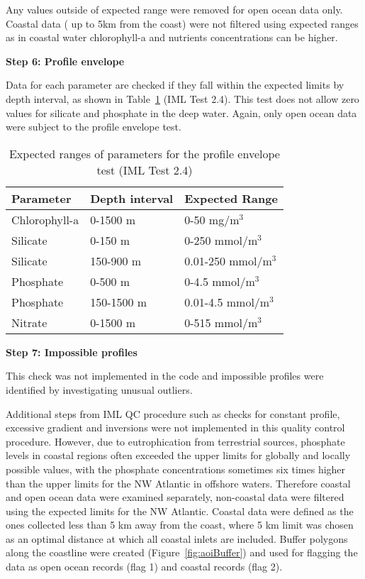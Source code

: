 \documentclass[letterpaper,portrait,11pt]{scrartcl}
\numberwithin{equation}{section}		%
\numberwithin{figure}{section}		%
\numberwithin{table}{section}				%
\begin{document}
\begin{appendices}
Any values outside of expected range were removed for open ocean data only. Coastal data ( up to 5km from the coast) were not filtered using expected ranges as in coastal water chlorophyll-a and nutrients concentrations can be higher. 

\textbf{Step 6: Profile envelope}

Data  for each parameter are checked if they fall within the expected limits by depth interval, as shown in Table~\ref{table:BioChemQC} (IML Test 2.4). This test does not allow zero values for silicate and phosphate in the deep water. Again, only open ocean data were subject to the profile envelope test.

\begin{table}[h]
\label{table:BioChemQC}
\caption{Expected ranges of parameters for the profile envelope test (IML Test 2.4)}
\begin{tabular}{lll}
Parameter & Depth interval & Expected Range \\
\hline
Chlorophyll-a & 0-1500 m & 0-50 mg/m$^{3}$ \\
Silicate & 0-150 m & 0-250 mmol/m$^{3}$ \\
Silicate & 150-900 m & 0.01-250 mmol/m$^{3}$ \\
Phosphate & 0-500 m & 0-4.5 mmol/m$^{3}$ \\
Phosphate & 150-1500 m & 0.01-4.5 mmol/m$^{3}$ \\
Nitrate & 0-1500 m & 0-515 mmol/m$^{3}$ \\
\end{tabular}
\end{table}


\textbf{Step 7: Impossible profiles}

This check was not implemented in the code and impossible profiles were identified by investigating unusual outliers.

Additional steps from IML QC procedure such as checks for constant profile, excessive gradient and inversions were not implemented in this quality control procedure. However, due to eutrophication from terrestrial sources, phosphate levels in coastal regions often exceeded the upper limits for globally and locally possible values, with the phosphate concentrations sometimes six times higher than the upper limits for the NW Atlantic in offshore waters. Therefore coastal and open ocean data were examined separately, non-coastal data were filtered using the expected limits for the NW Atlantic. Coastal data were defined as the ones collected less than 5 km away from the coast, where 5 km limit was chosen as an optimal distance at which all coastal inlets are included. Buffer polygons along the coastline were created (Figure~\ref{fig:aoiBuffer}) and used for flagging the data as open ocean records (flag 1) and coastal records (flag 2).


\end{appendices}
\end{document}

